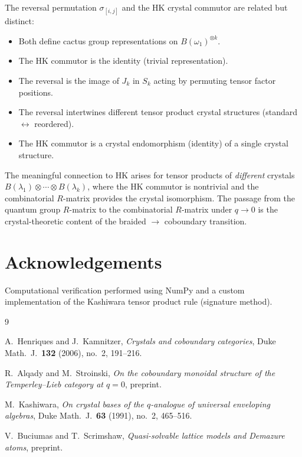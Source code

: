 \documentclass[11pt]{article}
\theoremstyle{remark}
\begin{document}
The reversal permutation $\sigma_{[i,j]}$ and the HK crystal commutor
are related but distinct:

\begin{itemize}
  \item Both define cactus group representations on $B(\omega_1)^{\otimes k}$.
  \item The HK commutor is the identity (trivial representation).
  \item The reversal is the image of $J_k$ in $S_k$ acting by permuting
    tensor factor positions.
  \item The reversal intertwines different tensor product crystal
    structures (standard $\leftrightarrow$ reordered).
  \item The HK commutor is a crystal endomorphism (identity) of
    a single crystal structure.
\end{itemize}

The meaningful connection to HK arises for tensor products of
\emph{different} crystals $B(\lambda_1) \otimes \cdots \otimes B(\lambda_k)$,
where the HK commutor is nontrivial and the combinatorial $R$-matrix
provides the crystal isomorphism. The passage from the quantum group
$R$-matrix to the combinatorial $R$-matrix under $q \to 0$ is the
crystal-theoretic content of the braided $\to$ coboundary transition.

\section*{Acknowledgements}
Computational verification performed using NumPy and a custom
implementation of the Kashiwara tensor product rule (signature method).

\begin{thebibliography}{9}

A.~Henriques and J.~Kamnitzer,
\emph{Crystals and coboundary categories},
Duke Math.\ J.\ \textbf{132} (2006), no.~2, 191--216.

R.~Alqady and M.~Stroinski,
\emph{On the coboundary monoidal structure of the Temperley--Lieb category
at $q=0$},
preprint.

M.~Kashiwara,
\emph{On crystal bases of the $q$-analogue of universal enveloping
algebras},
Duke Math.\ J.\ \textbf{63} (1991), no.~2, 465--516.

V.~Buciumas and T.~Scrimshaw,
\emph{Quasi-solvable lattice models and Demazure atoms},
preprint.

\end{thebibliography}
\end{document}
